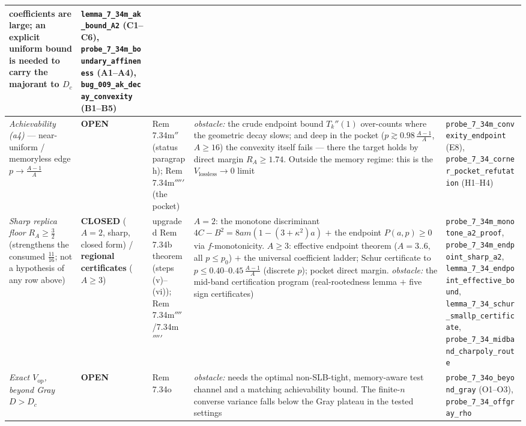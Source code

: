 \documentclass[
]{article}
\begin{document}
\begin{tabular}{@{}p{3.0cm}p{1.5cm}p{2.6cm}p{2.9cm}p{3.0cm}@{}}
coefficients are large; an explicit uniform bound is needed to carry the majorant
to $D_c$ &
\texttt{lemma\_7\_34m\_ak\_bound\_A2} (C1--C6), \texttt{probe\_7\_34m\_boundary\_affineness} (A1--A4), \texttt{bug\_009\_ak\_decay\_convexity} (B1--B5)\\
\hline
\emph{Achievability (a4)} --- near-uniform / memoryless edge $p\to\tfrac{A-1}A$
& \textbf{OPEN} & Rem 7.34m$''$ (status paragraph); Rem 7.34m$'''''$ (the
pocket) & \emph{obstacle:} the crude endpoint bound $T_k''(1)$ over-counts
where the geometric decay slows; and deep in the pocket ($p\gtrsim0.98\,
\tfrac{A-1}A$, $A\ge16$) the convexity itself fails --- there the target holds
by direct margin $R_A\ge1.74$. Outside the memory regime: this is the
$V_{\mathrm{lossless}}\to0$ limit & \texttt{probe\_7\_34m\_convexity\_endpoint}
(E8), \texttt{probe\_7\_34\_corner\_pocket\_refutation} (H1--H4)\\
\hline
\emph{Sharp replica floor} $R_A\ge\tfrac32$ (strengthens the consumed
$\tfrac{11}{16}$; not a hypothesis of any row above) & \textbf{CLOSED} ($A=2$,
sharp, closed form) / \textbf{regional certificates} ($A\ge3$) & upgraded
Rem 7.34b theorem (steps (v)--(vi)); Rem 7.34m$''''$/7.34m$'''''$ & $A=2$: the
monotone discriminant $4C-B^2=8am(1-(3+\kappa^2)a)$ $+$ the endpoint
$P(a,p)\ge0$ via $f$-monotonicity. $A\ge3$: effective endpoint theorem
($A=3..6$, all $p\le p_0$) $+$ the universal coefficient ladder; Schur
certificate to $p\le0.40$--$0.45\,\tfrac{A-1}A$ (discrete $p$); pocket direct
margin. \emph{obstacle:} the mid-band certification program (real-rootedness
lemma $+$ five sign certificates) &
\texttt{probe\_7\_34m\_monotone\_a2\_proof}, \texttt{probe\_7\_34m\_endpoint\_sharp\_a2}, \texttt{lemma\_7\_34\_endpoint\_effective\_bound}, \texttt{lemma\_7\_34\_schur\_smallp\_certificate}, \texttt{probe\_7\_34\_midband\_charpoly\_route}\\
\hline
\emph{Exact $V_{\mathrm{op}}$, beyond Gray} $D>D_c$ & \textbf{OPEN} & Rem 7.34o &
\emph{obstacle:} needs the optimal non-SLB-tight, memory-aware test channel
and a matching achievability bound. The finite-$n$ converse variance falls
below the Gray plateau in the tested settings & \texttt{probe\_7\_34o\_beyond\_gray} (O1--O3), \texttt{probe\_7\_34\_offgray\_rho}\\
\hline
\end{tabular}
\par\endgroup
\end{document}
